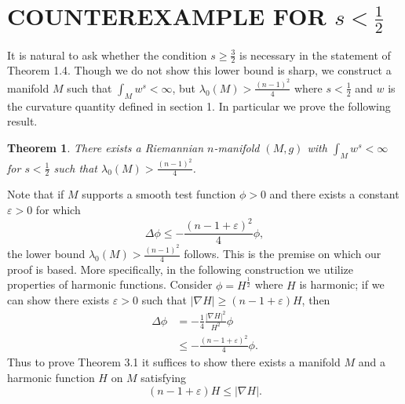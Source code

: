 \documentclass{amsart}
\newtheorem{theorem}{Theorem}[section]
\theoremstyle{definition}
\theoremstyle{remark}
\numberwithin{equation}{section}
\begin{document}
\section{COUNTEREXAMPLE FOR $s<\frac{1}{2}$}


It is natural to ask whether the condition $s\geq \frac{3}{2}$ is necessary in the statement of Theorem 1.4. Though we do not show this lower bound is sharp, we construct a manifold $M$ such that $\int_M w^s<\infty$, but $\lambda_0(M)>\frac{(n-1)^2}{4}$ where $s< \frac{1}{2}$ and $w$ is the curvature quantity defined in section 1. In particular we prove the following result.
\begin{theorem}
    There exists a Riemannian $n$-manifold $(M,g)$ with $\int_M w^s <\infty$ for $s<\frac{1}{2}$ such that $\lambda_0(M)>\frac{(n-1)^2}{4}$.
\end{theorem}
Note that if $M$ supports a smooth test function $\phi>0$ and there exists a constant $\varepsilon>0$ for which
\begin{equation*}
\Delta \phi\leq  -\frac{(n-1+\varepsilon)^2}{4}\phi,
\end{equation*}
the lower bound $\lambda_0(M)>\frac{(n-1)^2}{4}$ follows. This is the premise on which our proof is based. More specifically, in the following construction we utilize properties of harmonic functions. Consider $\phi = H^{\frac{1}{2}}$ where $H$ is harmonic; if we can show there exists $\varepsilon>0$ such that $|\nabla H|\geq (n-1+\varepsilon)H$, then
\begin{align*}
\Delta \phi &=-\frac{1}{4}\frac{|\nabla H|^2}{H^2}\phi\\
&\leq -\frac{(n-1+\varepsilon)^2}{4}\phi.
\end{align*}
Thus to prove Theorem 3.1 it suffices to show there exists a manifold $M$ and a harmonic function $H$ on $M$ satisfying 
\begin{equation}\label{greensfuncineq}
(n-1+\varepsilon)H\leq |\nabla H|.
\end{equation} 
\end{document}
